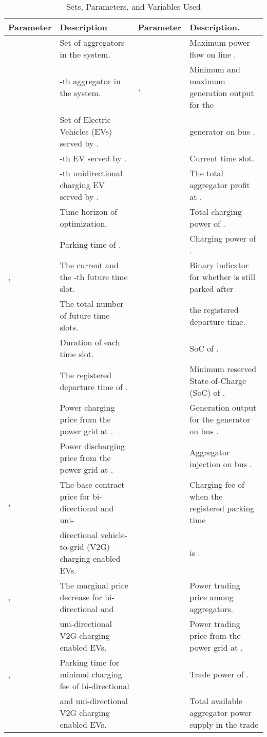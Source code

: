 \documentclass[conference]{IEEEtran}
\begin{document}
	\begin{table*}
		\caption{Sets, Parameters, and Variables Used}
		\centering
		\label{tbl:nomenclature}
		\begin{tabular}{l|l||l|l}
			\hline
			Parameter & Description & Parameter & Description. \\
			\hline
			 & Set of aggregators in the system. &  & Maximum power flow on line . \\
			 & -th aggregator in the system. & , & Minimum and maximum generation output for the \\
			 & Set of Electric Vehicles (EVs) served by . & & generator on bus . \\
			 & -th EV served by . &  & Current time slot. \\
			 & -th unidirectional charging EV served by . &  & The total aggregator profit at . \\
			 & Time horizon of optimization. &  & Total charging power of . \\
			 & Parking time of . &  & Charging power of . \\
			, & The current and the -th future time slot. &  & Binary indicator for whether  is still parked after \\
			 & The total number of future time slots. & & the registered departure time. \\
			 & Duration of each time slot. &  & SoC of . \\
			 & The registered departure time of . &  & Minimum reserved State-of-Charge (SoC) of . \\
			 & Power charging price from the power grid at . &  & Generation output for the generator on bus . \\
			 & Power discharging price from the power grid at . &  & Aggregator injection on bus . \\
			, & The base contract price for bi-directional and uni- &  & Charging fee of  when the registered parking time \\
			& directional vehicle-to-grid (V2G) charging enabled EVs. & & is . \\
			, & The marginal price decrease for bi-directional and &  & Power trading price among aggregators. \\
			& uni-directional V2G charging enabled EVs. &  & Power trading price from the power grid at . \\
			, & Parking time for minimal charging fee of bi-directional &  & Trade power of . \\
			& and uni-directional V2G charging enabled EVs. &  & Total available aggregator power supply in the trade \\

\end{tabular}
\end{table*}
\end{document}
